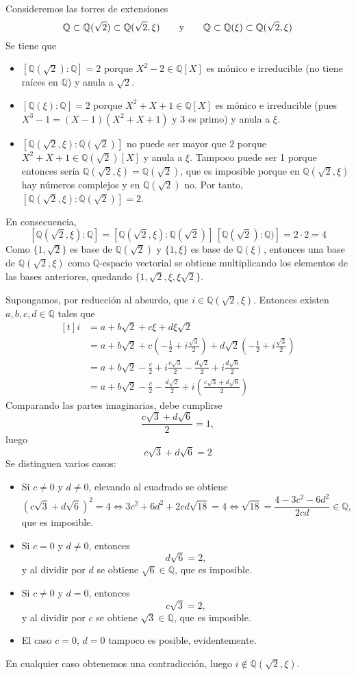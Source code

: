 \documentclass[11pt]{report}
\makeatletter
\renewenvironment{proof}[1][\proofname]{\par
  \pushQED{\qed}%
  \normalfont \topsep\z@skip %
  \trivlist
  \item[\hskip\labelsep
        \itshape
    #1\@addpunct{.}]\ignorespaces
}{%
  \popQED\endtrivlist\@endpefalse
}
\newcommand{\Q}{\mathbb Q}
\makeatother
\begin{document}
\begin{proof}
Consideremos las torres de extensiones 
\[\Q \subset \Q(\sqrt{2}) \subset \Q(\sqrt{2},\xi) \qquad \textup{y} \qquad \Q \subset \Q(\xi) \subset \Q(\sqrt{2},\xi)\]
Se tiene que
\begin{itemize}
    \item $[\Q(\sqrt{2}):\Q] = 2$ porque $X^2-2 \in \Q[X]$ es mónico e irreducible (no tiene raíces en $\Q$) y anula a $\sqrt{2}$.
    \item $[\Q(\xi):\Q] = 2$ porque $X^2+X+1 \in \Q[X]$ es mónico e irreducible (pues $X^3-1=(X-1)(X^2+X+1)$ y 3 es primo) y anula a $\xi$.
    \item $[\Q(\sqrt{2},\xi):\Q(\sqrt{2})]$ no puede ser mayor que $2$ porque $X^2+X+1 \in \Q(\sqrt{2})[X]$ y anula a $\xi$. Tampoco puede ser 1 porque entonces sería $\Q(\sqrt{2},\xi) = \Q(\sqrt{2})$, que es imposible porque en $\Q(\sqrt{2},\xi)$ hay números complejos y en $\Q(\sqrt{2})$ no. Por tanto, $[\Q(\sqrt{2},\xi):\Q(\sqrt{2})] = 2$.
\end{itemize}
En consecuencia,
\[[\Q(\sqrt{2},\xi):\Q] = [\Q(\sqrt{2},\xi):\Q(\sqrt{2})] \, [\Q(\sqrt{2}):\Q)] = 2 \cdot 2 = 4\]
Como $\{1,\sqrt{2}\}$ es base de $\Q(\sqrt{2})$ y $\{1,\xi\}$ es base de $\Q(\xi)$, entonces una base de $\Q(\sqrt{2},\xi)$ como $\Q$-espacio vectorial se obtiene multiplicando los elementos de las bases anteriores, quedando $\{1,\sqrt{2},\xi,\xi\sqrt{2}\}$.

Supongamos, por reducción al absurdo, que $i \in \Q(\sqrt{2},\xi)$. Entonces existen $a,b,c,d \in \Q$ tales que
\[
\begin{aligned}[t]
i &= a+b\sqrt{2}+c\xi+d\xi\sqrt{2} \\ &= a+b\sqrt{2}+c\left(-\frac{1}{2}+i\frac{\sqrt{3}}{2}\right)+d\sqrt{2}\left(-\frac{1}{2}+i\frac{\sqrt{3}}{2}\right) \\
&= a+b\sqrt{2}-\frac{c}{2}+i\frac{c\sqrt{3}}{2}-\frac{d\sqrt{2}}{2}+i\frac{d\sqrt{6}}{2} \\
&= a+b\sqrt{2}-\frac{c}{2}-\frac{d\sqrt{2}}{2}+i\left(\frac{c\sqrt{3}+d\sqrt{6}}{2}\right)
\end{aligned}
\]
Comparando las partes imaginarias, debe cumplirse
\[\frac{c\sqrt{3}+d\sqrt{6}}{2} = 1, \]
luego
\[c\sqrt{3}+d\sqrt{6} = 2 \]
Se distinguen varios casos:
\begin{itemize}
    \item Si $c \neq 0$ y $d \neq 0$, elevando al cuadrado se obtiene
    \[(c\sqrt{3}+d\sqrt{6})^2 = 4 \iff 3c^2+6d^2+2cd\sqrt{18} = 4 \iff \sqrt{18} = \frac{4-3c^2-6d^2}{2cd} \in \Q,\]
    que es imposible.
    \item Si $c =0$ y $d \neq 0$, entonces
    \[d\sqrt{6} = 2,\]
    y al dividir por $d$ se obtiene $\sqrt{6} \in \Q$, que es imposible.
    \item Si $c \neq 0$ y $d = 0$, entonces
    \[c\sqrt{3} = 2,\]
    y al dividir por $c$ se obtiene $\sqrt{3} \in \Q$, que es imposible.
    \item El caso $c = 0$, $d = 0$ tampoco es posible, evidentemente.
\end{itemize}
En cualquier caso obtenemos una contradicción, luego $i \not\in \Q(\sqrt{2},\xi)$.
\end{proof}
\end{document}
